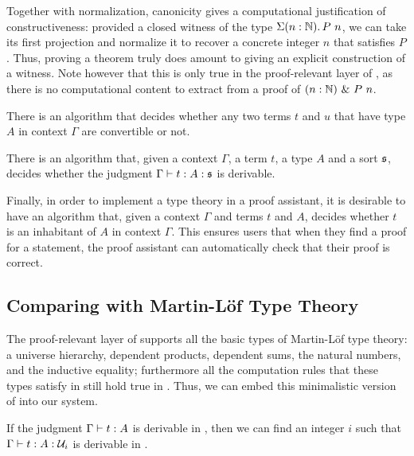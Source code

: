 Together with normalization, canonicity gives a computational justification of
constructiveness: 
% 
provided a closed witness of the type \( \Depsum[n]{\Nat}{P\ n} \), we can take 
its first projection and normalize it to recover a concrete integer \( n \) that 
satisfies \( P \).
% 
Thus, proving a theorem truly does amount to giving an explicit construction of a 
witness.
% 
Note however that this is only true in the proof-relevant layer of \SetoidCC, as 
there is no computational content to extract from a proof of 
\( \Exists[n]{\Nat}{P\ n} \).

\begin{theorem}[Decidability]
	There is an algorithm that decides whether any two terms \( t \) and 
	\( u \) that have type \( A \) in context \( \Gamma \) are convertible 
	or not.

	There is an algorithm that, given a context \( \Gamma \), a term \( t \), 
	a type \( A \) and a sort \( \Univ \), decides whether the judgment 
	\( \tytmannotated{\Gamma}{t}{A}{\Univ} \) is derivable.
\end{theorem}

Finally, in order to implement a type theory in a proof assistant, it is desirable to have an
algorithm that, given a context \( \Gamma \) and terms \( t \) and \( A \), decides whether \( t \)
is an inhabitant of \( A \) in context \( \Gamma \). This ensures users that when they find a
proof for a statement, the proof assistant can automatically check that their proof is correct.

\subsection{Comparing \SetoidCC with Martin-Löf Type Theory}
 
The proof-relevant layer of \SetoidCC supports all the basic types of Martin-Löf 
type theory: a universe hierarchy, dependent products, dependent sums, the natural 
numbers, and the inductive equality; furthermore all the computation rules that 
these types satisfy in \MLTT still hold true in \SetoidCC.
% 
Thus, we can embed this minimalistic version of \MLTT into our system.

\begin{theorem}[Embedding]
	If the judgment \( \tytm{\Gamma}{t}{A} \) is derivable in \MLTT, then
	we can find an integer \( i \) such that \( \tytmannotated{\Gamma}{t}{A}{\Type_i} \)
	is derivable in \SetoidCC. 
\end{theorem} 

